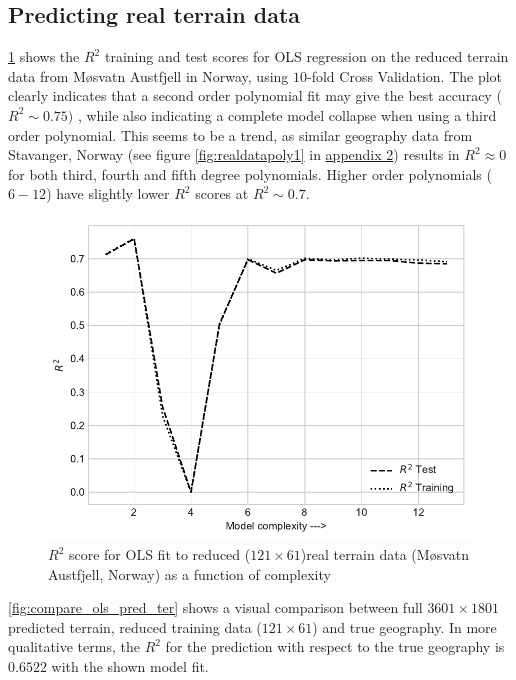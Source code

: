 \documentclass[%
oneside,                 %
final,                   %
10pt]{article}
\begin{document}
\subsection{Predicting real terrain data}
\ref{fig:realdatapoly} shows the $R^2$ training and test scores for OLS regression on the reduced terrain data from Møsvatn Austfjell in Norway, using $10$-fold Cross Validation. The plot clearly indicates that a second order polynomial fit may give the best accuracy ($R^2\sim 0.75)$ , while also indicating a complete model collapse when using a third order polynomial. This seems to be a trend, as similar geography data from Stavanger, Norway (see figure \ref{fig:realdatapoly1} in \hyperref[APP_1]{appendix 2}) results in $R^2 \approx0 $ for both third, fourth and fifth degree polynomials. Higher order polynomials ($6-12$) have slightly lower $R^2$ scores at $R^2\sim 0.7$.
\begin{figure}[!h]
        \centering 
         \includegraphics[scale=0.7]{../Results/Part_g/OLSr2_terraintest2.pdf} 
        \caption{$R^2$ score for OLS fit to reduced ($121 \times 61$)real terrain data (Møsvatn Austfjell, Norway) as a function of complexity}
        \label{fig:realdatapoly}   
\end{figure}  


\ref{fig:compare_ols_pred_ter} shows a visual comparison between full $3601 \times 1801$  predicted terrain, reduced training data ($121 \times 61$) and true geography. In more qualitative terms, the $R^2$ for the prediction with respect to the true geography is $0.6522$ with the shown model fit.
\end{document}
